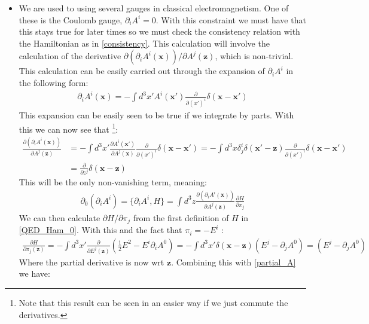 \documentclass[11pt]{article}
\numberwithin{equation}{section}
\begin{document}
\begin{itemize}
   \item We are used to using several gauges in classical electromagnetism. One of these is the Coulomb gauge, $\partial_iA^i = 0$. With this constraint we must have that this stays true for later times so we must check the consistency relation with the Hamiltonian as in \ref{consistency}. This calculation will involve the calculation of the derivative $\partial\left(\partial_iA^i(\textbf{x})\right)/\partial A^j(\textbf{z})$, which is non-trivial. This calculation can be easily carried out through the expansion of $\partial_iA^i$ in the following form:
   \begin{align}
   \label{delta_prop}
     \partial_iA^i(\textbf{x}) = -\int d^3x'A^i(\textbf{x}')\frac{\partial }{\partial(x')^i}\delta(\textbf{x}-\textbf{x}')
   \end{align}
   This expansion can be easily seen to be true if we integrate by parts. With this we can now see that \footnote{Note that this result can be seen in an easier way if we just commute the derivatives.}:
   \begin{align}
   \label{partial_A}
     \frac{\partial\left(\partial_iA^i(\textbf{x})\right)}{\partial A^j(\textbf{z})} &= -\int d^3x'\frac{\partial A^i(\textbf{x}')}{\partial A^j(\textbf{x})}\frac{\partial}{\partial (x')^i}\delta(\textbf{x}-\textbf{x}') = -\int d^3x\delta^{i}_j\delta(\textbf{x}'-\textbf{z})\frac{\partial}{\partial (x')^i}\delta(\textbf{x}-\textbf{x}') \nonumber \\
     & = \frac{\partial}{\partial z^j}\delta(\textbf{x}-\textbf{z}) 
   \end{align}
   This will be the only non-vanishing term, meaning:
   \begin{align*}
    \partial_0(\partial_iA^i)  = \{\partial_iA^i,H\}  = \int d^3z\frac{\partial\left(\partial_iA^i(\textbf{x})\right)}{\partial A^j(\textbf{z})}\frac{\partial H}{\partial \pi_j}
   \end{align*}
   We can then calculate $\partial H/\partial \pi_j$ from the first definition of $H$ in \ref{QED_Ham_0}. With this and the fact that $\pi_{i} = -E^i$ :
   \begin{align*}
      \frac{\partial H}{\partial \pi_j(\textbf{z})} = -\int d^3x'\frac{\partial}{\partial E^j(\textbf{z})}\left(\frac{1}{2}E^2-E^i\partial_iA^0\right) = -\int d^3x'\delta(\textbf{x}-\textbf{z})(E^j - \partial_jA^0)=(E^j - \partial_jA^0)
    \end{align*} 
    Where the partial derivative is now wrt $\textbf{z}$. Combining this with \ref{partial_A} we have:

\end{itemize}
\end{document}
